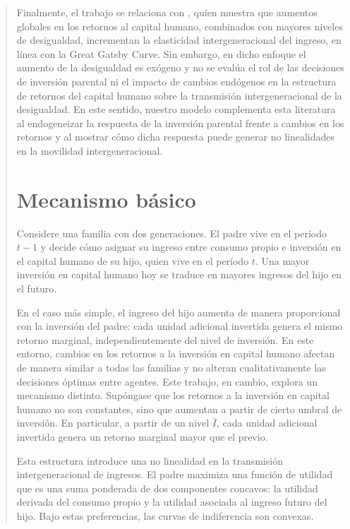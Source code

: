 \documentclass[12pt]{article}
\begin{document}
\begin{abstract}
Finalmente, el trabajo se relaciona con \textcite{Solon_2004}, quien muestra que aumentos globales en los retornos al capital humano, combinados con mayores niveles de desigualdad, incrementan la elasticidad intergeneracional del ingreso, en línea con la Great Gatsby Curve. Sin embargo, en dicho enfoque el aumento de la desigualdad es exógeno y no se evalúa el rol de las decisiones de inversión parental ni el impacto de cambios endógenos en la estructura de retornos del capital humano sobre la transmisión intergeneracional de la desigualdad. En este sentido, nuestro modelo complementa esta literatura al endogeneizar la respuesta de la inversión parental frente a cambios en los retornos y al mostrar cómo dicha respuesta puede generar no linealidades en la movilidad intergeneracional.





\section{Mecanismo básico}

Considere una familia con dos generaciones. El padre vive en el período $t-1$ y decide cómo asignar su ingreso entre consumo propio e inversión en el capital humano de su hijo, quien vive en el período $t$. Una mayor inversión en capital humano hoy se traduce en mayores ingresos del hijo en el futuro.

En el caso más simple, el ingreso del hijo aumenta de manera proporcional con la inversión del padre: cada unidad adicional invertida genera el mismo retorno marginal, independientemente del nivel de inversión. En este entorno, cambios en los retornos a la inversión en capital humano afectan de manera similar a todas las familias y no alteran cualitativamente las decisiones óptimas entre agentes. Este trabajo, en cambio, explora un mecanismo distinto. Supóngase que los retornos a la inversión en capital humano no son constantes, sino que aumentan a partir de cierto umbral de inversión. En particular, a partir de un nivel $\bar I$, cada unidad adicional invertida genera un retorno marginal mayor que el previo.

Esta estructura introduce una no linealidad en la transmisión intergeneracional de ingresos. El padre maximiza una función de utilidad que es una suma ponderada de dos componentes concavos: la utilidad derivada del consumo propio y la utilidad asociada al ingreso futuro del hijo. Bajo estas preferencias, las curvas de indiferencia son convexas.


\end{abstract}
\end{document}
